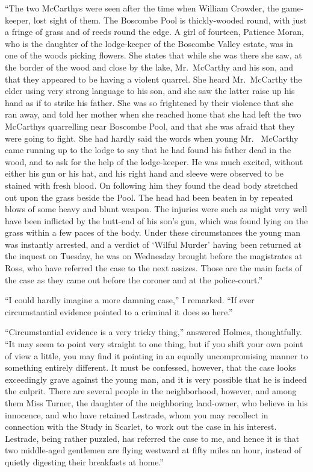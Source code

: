 “The two McCarthys were seen after the time when William
Crowder, the game-keeper, lost sight of them. The
Boscombe Pool is thickly-wooded round, with just a fringe of
grass and of reeds round the edge. A girl of fourteen, Patience
Moran, who is the daughter of the lodge-keeper of
the Boscombe Valley estate, was in one of the woods picking
flowers. She states that while she was there she saw, at
the border of the wood and close by the lake, Mr.~McCarthy
and his son, and that they appeared to be having a violent
quarrel. She heard Mr.~McCarthy the elder using very strong
language to his son, and she saw the latter raise up his hand
as if to strike his father. She was so frightened by their violence
that she ran away, and told her mother when she reached
home that she had left the two McCarthys quarrelling near
Boscombe Pool, and that she was afraid that they were going
to fight. She had hardly said the words when young Mr.\ %
McCarthy came running up to the lodge to say that he had
found his father dead in the wood, and to ask for the help of
the lodge-keeper. He was much excited, without either his
gun or his hat, and his right hand and sleeve were observed
to be stained with fresh blood. On following him they found
the dead body stretched out upon the grass beside the Pool.
The head had been beaten in by repeated blows of some heavy
and blunt weapon. The injuries were such as might very
well have been inflicted by the butt-end of his son’s gun,
which was found lying on the grass within a few paces of the
body. Under these circumstances the young man was instantly
arrested, and a verdict of ‘Wilful Murder’ having been
returned at the inquest on Tuesday, he was on Wednesday
brought before the magistrates at Ross, who have referred the
case to the next assizes. Those are the main facts of the case
as they came out before the coroner and at the police-court.”

“I could hardly imagine a more damning case,” I remarked.
“If ever circumstantial evidence pointed to a criminal
it does so here.”

“Circumstantial evidence is a very tricky thing,” answered
Holmes, thoughtfully. “It may seem to point very straight
to one thing, but if you shift your own point of view a little,
you may find it pointing in an equally uncompromising manner
to something entirely different. It must be confessed,
however, that the case looks exceedingly grave against the
young man, and it is very possible that he is indeed the culprit.
There are several people in the neighborhood, however,
and among them Miss Turner, the daughter of the neighboring
land-owner, who believe in his innocence, and who have
retained Lestrade, whom you may recollect in connection
with the Study in Scarlet, to work out the case in his interest.
Lestrade, being rather puzzled, has referred the case to me,
and hence it is that two middle-aged gentlemen are flying
westward at fifty miles an hour, instead of quietly digesting
their breakfasts at home.”

